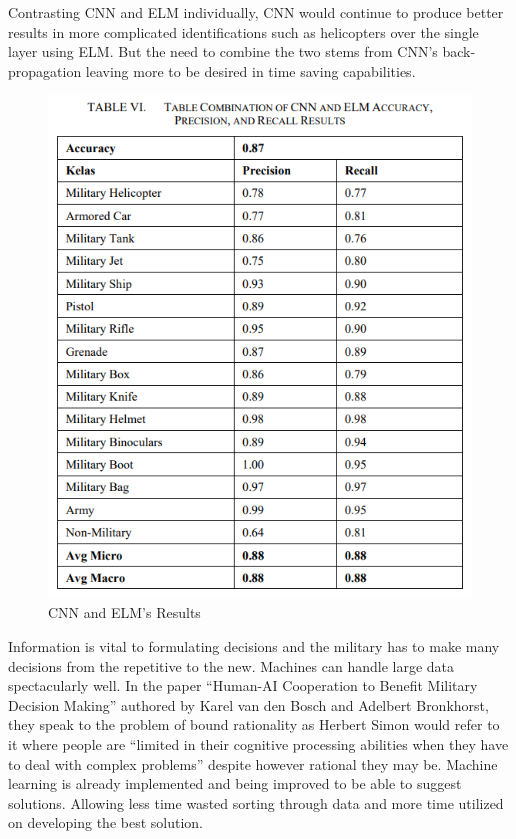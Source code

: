 \documentclass[12pt,twoside]{article}
\begin{document}
Contrasting CNN and ELM individually, CNN would continue to produce better results in more complicated identifications such as helicopters over the single layer using ELM. But the need to combine the two stems from CNN's back-propagation leaving more to be desired in time saving capabilities.\cite{CNN}\\

\newpage
\begin{figure} [!h]
    \centering
    \includegraphics[width = \textwidth]{figures/precisionTable.png}
    \caption{CNN and ELM's Results \cite{CNN}}
    \label{fig:precisionTable}
\end{figure}

Information is vital to formulating decisions and the military has to make many decisions from the repetitive to the new. Machines can handle large data spectacularly well. In the paper ``Human-AI Cooperation to Benefit Military Decision Making'' authored by Karel van den Bosch and Adelbert Bronkhorst, they speak to the problem of bound rationality as Herbert Simon would refer to it where people are ``limited in their cognitive processing abilities when they have to deal with complex problems'' despite however rational they may be. Machine learning is already implemented and being improved to be able to suggest solutions. Allowing less time wasted sorting through data and more time utilized on developing the best solution. \\
\end{document}

